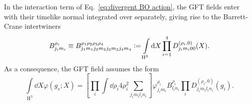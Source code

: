 \documentclass[11pt,a4paper]{article}
\newcommand{\HH}{\text{H}^3}
\newcommand{\defeq}{\vcentcolon=}
\begin{document}
In the interaction term of Eq.~\eqref{eq:divergent BO action}, the GFT fields enter with their timelike normal integrated over separately, giving rise to the Barrett-Crane intertwiners~\cite{Barrett:1999qw,Oriti:2003wf}
%
\begin{equation}\label{eq:definition of BC intertwiner}
B^{\rho_i}_{j_i m_i} 
\equiv
B^{\rho_1 \rho_2 \rho_3 \rho_4}_{j_1 m_1 j_2 m_2 j_3 m_3 j_4 m_4}
\defeq
\int\limits_{\HH}\dd{X}\prod_{i=1}^4 D^{(\rho_i,0)}_{j_i m_i 00}(X).
\end{equation}
%
As a consequence, the GFT field assumes the form
%
\begin{equation}\label{eq:group field with all right covariance, simplicity and integration over normal}
\int\limits_{\HH}\dd{X}\varphi(g_v;X)
=
\left[\prod_i \int\dd{\rho_i}4\rho_i^2\sum_{j_i m_i l_i n_i}\right]\varphi^{\rho_i}_{j_i m_i}B^{\rho_i}_{l_i n_i}\prod_{i}D^{(\rho_i,0)}_{j_i m_i l_i n_i}(g_i).
\end{equation}
%
\end{document}
